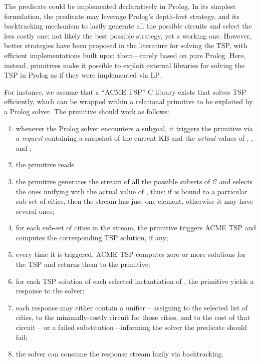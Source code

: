 \documentclass[12pt,a4paper,openright,twoside]{book}
\begin{document}
The predicate  could be implemented declaratively in Prolog.
%
In its simplest formulation, the predicate may leverage Prolog's depth-first strategy, and its backtracking mechanism to lazily generate all the possible circuits and select the less costly one: not likely the best possible strategy, yet a working one.
%
However, better strategies have been proposed in the literature for solving the TSP, with efficient implementations built upon them---rarely based on pure Prolog.
%
Here, instead, primitives make it possible to exploit external libraries for solving the TSP in Prolog as if they were implemented via LP.

For instance, we assume that a ``ACME TSP'' C library exists that solves TSP efficiently, which can be wrapped within a relational primitive  to be exploited by a Prolog solver.
%
The primitive  should work as follows:
%
\begin{enumerate}
    \item whenever the Prolog solver encounters a  subgoal, it triggers the primitive via a \emph{request} containing a snapshot of the current KB and the \emph{actual} values of , , and ;
    \item the primitive reads
    \item the primitive generates the stream of all the possible subsets of $\mathcal{C}$ and selects the ones unifying with the actual value of , thus: if  is bound to a particular sub-set of cities, then the stream has just one element, otherwise it may have several ones;
    \item for each sub-set of cities in the stream, the primitive triggers ACME TSP and computes the corresponding TSP solution, if any;
    \item every time it is triggered, ACME TSP computes zero or more solutions for the TSP and returns them to the primitive;
    \item for each TSP solution of each selected instantiation of , the primitive yields a response to the solver;
    \item each response may either contain a unifier -- assigning  to the selected list of cities,  to the minimally-costly circuit for those cities, and  to the cost of that circuit -- or a failed substitution---informing the solver the  predicate should fail;
    \item the solver can consume the response stream lazily via backtracking.
\end{enumerate}
\end{document}
